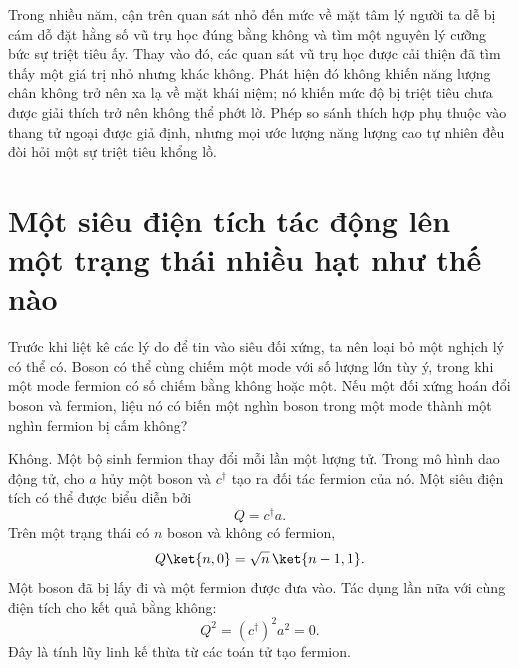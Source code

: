 \begin{classroomqa}
\end{classroomqa}

Trong nhiều năm, cận trên quan sát nhỏ đến mức về mặt tâm lý người ta dễ bị cám dỗ đặt hằng số vũ trụ học đúng bằng không và tìm một nguyên lý cưỡng bức sự triệt tiêu ấy. Thay vào đó, các quan sát vũ trụ học được cải thiện đã tìm thấy một giá trị nhỏ nhưng khác không. Phát hiện đó không khiến năng lượng chân không trở nên xa lạ về mặt khái niệm; nó khiến mức độ bị triệt tiêu chưa được giải thích trở nên không thể phớt lờ. Phép so sánh thích hợp phụ thuộc vào thang tử ngoại được giả định, nhưng mọi ước lượng năng lượng cao tự nhiên đều đòi hỏi một sự triệt tiêu khổng lồ.

\section{Một siêu điện tích tác động lên một trạng thái nhiều hạt như thế nào}

Trước khi liệt kê các lý do để tin vào siêu đối xứng, ta nên loại bỏ một nghịch lý có thể có. Boson có thể cùng chiếm một mode với số lượng lớn tùy ý, trong khi một mode fermion có số chiếm bằng không hoặc một. Nếu một đối xứng hoán đổi boson và fermion, liệu nó có biến một nghìn boson trong một mode thành một nghìn fermion bị cấm không?

Không. Một bộ sinh fermion thay đổi mỗi lần một lượng tử. Trong mô hình dao động tử, cho \(a\) hủy một boson và \(c^\dagger\) tạo ra đối tác fermion của nó. Một siêu điện tích có thể được biểu diễn bởi
\begin{equation}
Q=c^\dagger a.
\end{equation}
Trên một trạng thái có \(n\) boson và không có fermion,
\begin{equation}
Q\ket{n,0}
=\sqrt n\,\ket{n-1,1}.
\end{equation}
Một boson đã bị lấy đi và một fermion được đưa vào. Tác dụng lần nữa với cùng điện tích cho kết quả bằng không:
\begin{equation}
Q^2=(c^\dagger)^2a^2=0.
\end{equation}
Đây là tính lũy linh kế thừa từ các toán tử tạo fermion.

